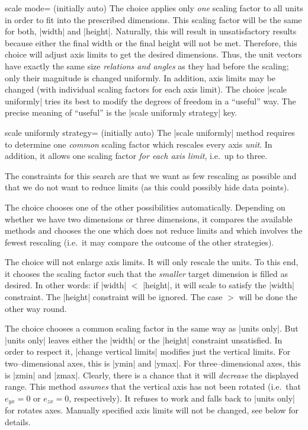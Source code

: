 \begin{pgfplotskey}{scale mode= (initially auto)}
	The choice  applies only \emph{one} scaling factor to all units in order to fit into the prescribed dimensions. This scaling factor will be the same for both, |width| and |height|. Naturally, this will result in unsatisfactory results because either the final width or the final height will not be met. Therefore, this choice will adjust axis limits to get the desired dimensions. Thus, the unit vectors have exactly the same size \emph{relations and angles} as they had before the scaling; only their magnitude is changed uniformly. In addition, axis limits may be changed (with individual scaling factors for each axis limit). The choice |scale uniformly| tries its best to modify the degrees of freedom in a ``useful'' way. The precise meaning of ``useful'' is the |scale uniformly strategy| key.

	\begin{pgfplotskey}{scale uniformly strategy= (initially auto)}
		The |scale uniformly| method requires to determine one \emph{common} scaling factor which rescales every axis \emph{unit}. In addition, it allows one scaling factor \emph{for each axis limit}, i.e.\ up to three.

		The constraints for this search are that we want as few rescaling as possible and that we do not want to reduce limits (as this could possibly hide data points).

		The choice  chooses one of the other possibilities automatically. Depending on whether we have two dimensions or three dimensions, it compares the available methods and chooses the one which does not reduce limits and which involves the fewest rescaling (i.e.\ it may compare the outcome of the other strategies).

		The choice  will not enlarge axis limits. It will only rescale the units. To this end, it chooses the scaling factor such that the \emph{smaller} target dimension is filled as desired. In other words: if |width| $< $ |height|, it will scale to satisfy the |width| constraint. The |height| constraint will be ignored. The case $>$ will be done the other way round.

		The choice  chooses a common scaling factor in the same way as |units only|. But |units only| leaves either the |width| or the |height| constraint unsatisfied. In order to respect it, |change vertical limits| modifies just the vertical limits. For two--dimensional axes, this is |ymin| and |ymax|. For three--dimensional axes, this is |zmin| and |zmax|. Clearly, there is a chance that it will \emph{decrease} the displayed range. This method \emph{assumes} that the vertical axis has not been rotated (i.e.\ that $e_{yx}=0$ or $e_{zx}=0$, respectively). It refuses to work and falls back to |units only| for rotates axes. Manually specified axis limits will not be changed, see below for details.


\end{pgfplotskey}
\end{pgfplotskey}
